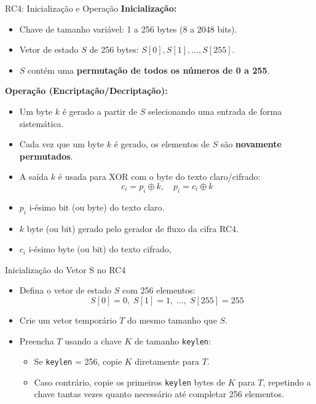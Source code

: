 \begin{frame}{RC4: Inicialização e Operação}
\textbf{Inicialização:}
\begin{itemize}
    \item Chave de tamanho variável: 1 a 256 bytes (8 a 2048 bits).
    \item Vetor de estado $S$ de 256 bytes: $S[0], S[1], \dots, S[255]$.
    \item $S$ contém uma \textbf{permutação de todos os números de 0 a 255}.
\end{itemize}

\textbf{Operação (Encriptação/Decriptação):}
\begin{itemize}
    \item Um byte $k$ é gerado a partir de $S$ selecionando uma entrada de forma sistemática.
    \item Cada vez que um byte $k$ é gerado, os elementos de $S$ são \textbf{novamente permutados}.
    \item A saída $k$ é usada para XOR com o byte do texto claro/cifrado:
    \[
        c_i = p_i \oplus k, \quad p_i = c_i \oplus k
    \]
\end{itemize}

\begin{itemize}
    \item $p_i$
i-ésimo  bit (ou byte)  do texto claro.

\item $k$ byte (ou bit) gerado pelo gerador de fluxo da cifra RC4.

\item  $c_i$
i-ésimo byte (ou bit) do texto cifrado,
\end{itemize}

\end{frame}

\begin{frame}{Inicialização do Vetor S no RC4}
\begin{itemize}
    \item Defina o vetor de estado $S$ com 256 elementos:
    \[
        S[0] = 0, \; S[1] = 1, \; \dots, \; S[255] = 255
    \]
    \item Crie um vetor temporário $T$ do mesmo tamanho que $S$.
    \item Preencha $T$ usando a chave $K$ de tamanho \texttt{keylen}:
    \begin{itemize}
        \item Se \texttt{keylen} = 256, copie $K$ diretamente para $T$.
        \item Caso contrário, copie os primeiros \texttt{keylen} bytes de $K$ para $T$, repetindo a chave tantas vezes quanto necessário até completar 256 elementos.
    \end{itemize}
\end{itemize}
\end{frame}


